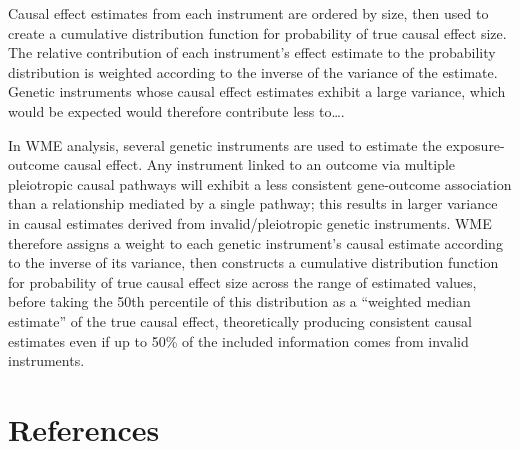 \documentclass[
]{article}
\begin{document}
Causal effect estimates from each instrument are ordered by size, then used to create a cumulative distribution function for probability of true causal effect size. The relative contribution of each instrument's effect estimate to the probability distribution is weighted according to the inverse of the variance of the estimate. Genetic instruments whose causal effect estimates exhibit a large variance, which would be expected would therefore contribute less to\ldots.

In WME analysis, several genetic instruments are used to estimate the exposure-outcome causal effect. Any instrument linked to an outcome via multiple pleiotropic causal pathways will exhibit a less consistent gene-outcome association than a relationship mediated by a single pathway; this results in larger variance in causal estimates derived from invalid/pleiotropic genetic instruments. WME therefore assigns a weight to each genetic instrument's causal estimate according to the inverse of its variance, then constructs a cumulative distribution function for probability of true causal effect size across the range of estimated values, before taking the 50th percentile of this distribution as a ``weighted median estimate'' of the true causal effect, theoretically producing consistent causal estimates even if up to 50\% of the included information comes from invalid instruments.

\newpage

\section{References}\label{references}
\end{document}
